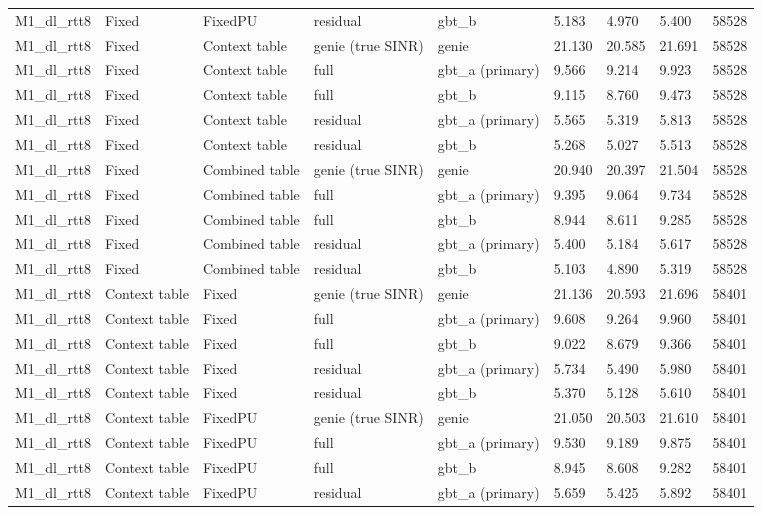 \documentclass[10pt]{article}
\begin{document}
\begin{landscape}
\begin{longtable}{@{}lllllllll@{}}
M1\_dl\_rtt8 & Fixed & FixedPU & residual & gbt\_b & 5.183 & 4.970 & 5.400 & 58528 \\
M1\_dl\_rtt8 & Fixed & Context table & genie (true SINR) & genie & 21.130 & 20.585 & 21.691 & 58528 \\
M1\_dl\_rtt8 & Fixed & Context table & full & gbt\_a (primary) & 9.566 & 9.214 & 9.923 & 58528 \\
M1\_dl\_rtt8 & Fixed & Context table & full & gbt\_b & 9.115 & 8.760 & 9.473 & 58528 \\
M1\_dl\_rtt8 & Fixed & Context table & residual & gbt\_a (primary) & 5.565 & 5.319 & 5.813 & 58528 \\
M1\_dl\_rtt8 & Fixed & Context table & residual & gbt\_b & 5.268 & 5.027 & 5.513 & 58528 \\
M1\_dl\_rtt8 & Fixed & Combined table & genie (true SINR) & genie & 20.940 & 20.397 & 21.504 & 58528 \\
M1\_dl\_rtt8 & Fixed & Combined table & full & gbt\_a (primary) & 9.395 & 9.064 & 9.734 & 58528 \\
M1\_dl\_rtt8 & Fixed & Combined table & full & gbt\_b & 8.944 & 8.611 & 9.285 & 58528 \\
M1\_dl\_rtt8 & Fixed & Combined table & residual & gbt\_a (primary) & 5.400 & 5.184 & 5.617 & 58528 \\
M1\_dl\_rtt8 & Fixed & Combined table & residual & gbt\_b & 5.103 & 4.890 & 5.319 & 58528 \\
M1\_dl\_rtt8 & Context table & Fixed & genie (true SINR) & genie & 21.136 & 20.593 & 21.696 & 58401 \\
M1\_dl\_rtt8 & Context table & Fixed & full & gbt\_a (primary) & 9.608 & 9.264 & 9.960 & 58401 \\
M1\_dl\_rtt8 & Context table & Fixed & full & gbt\_b & 9.022 & 8.679 & 9.366 & 58401 \\
M1\_dl\_rtt8 & Context table & Fixed & residual & gbt\_a (primary) & 5.734 & 5.490 & 5.980 & 58401 \\
M1\_dl\_rtt8 & Context table & Fixed & residual & gbt\_b & 5.370 & 5.128 & 5.610 & 58401 \\
M1\_dl\_rtt8 & Context table & FixedPU & genie (true SINR) & genie & 21.050 & 20.503 & 21.610 & 58401 \\
M1\_dl\_rtt8 & Context table & FixedPU & full & gbt\_a (primary) & 9.530 & 9.189 & 9.875 & 58401 \\
M1\_dl\_rtt8 & Context table & FixedPU & full & gbt\_b & 8.945 & 8.608 & 9.282 & 58401 \\
M1\_dl\_rtt8 & Context table & FixedPU & residual & gbt\_a (primary) & 5.659 & 5.425 & 5.892 & 58401 \\

\end{longtable}
\end{landscape}
\end{document}

